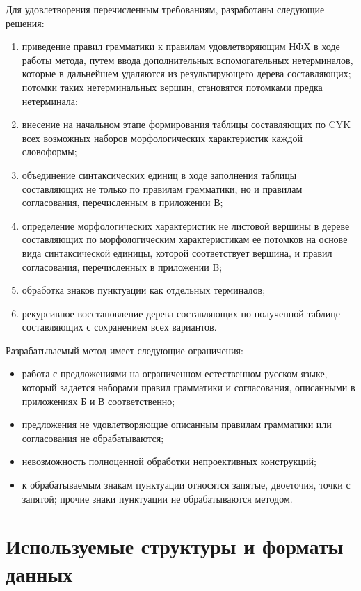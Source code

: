 Для удовлетворения перечисленным требованиям, разработаны следующие решения:
\begin{enumerate}
	\item приведение правил грамматики к правилам удовлетворяющим НФХ в ходе работы метода, путем ввода дополнительных вспомогательных нетерминалов, которые в дальнейшем удаляются из результирующего дерева составляющих; потомки таких нетерминальных вершин, становятся потомками предка нетерминала;
	\item внесение на начальном этапе формирования таблицы составляющих по CYK всех возможных наборов морфологических характеристик каждой словоформы;
	\item объединение синтаксических единиц в ходе заполнения таблицы составляющих не только по правилам грамматики, но и правилам согласования, перечисленным в приложении В;
	\item определение морфологических характеристик не листовой вершины в дереве составляющих по морфологическим характеристикам ее потомков на основе вида синтаксической единицы, которой соответствует вершина, и правил согласования, перечисленных в приложении B;
	\item обработка знаков пунктуации как отдельных терминалов;
	\item рекурсивное восстановление дерева составляющих по полученной таблице составляющих с сохранением всех вариантов.
\end{enumerate}

Разрабатываемый метод имеет следующие ограничения:
\begin{itemize}
	\item работа с предложениями на ограниченном естественном русском языке, который задается наборами правил грамматики и согласования, описанными в приложениях Б и В соответственно;
	\item предложения не удовлетворяющие описанным правилам грамматики или согласования не обрабатываются;
	\item невозможность полноценной обработки непроективных конструкций;
	\item к обрабатываемым знакам пунктуации относятся запятые, двоеточия, точки с запятой; прочие знаки пунктуации не обрабатываются методом.
\end{itemize}

\section{Используемые структуры и форматы данных}

